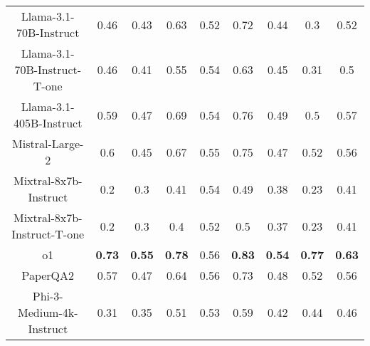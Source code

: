 \begin{tabular}{ccccccccc}
Llama-3.1-70B-Instruct & 0.46 & 0.43 & 0.63 & 0.52 & 0.72 & 0.44 & 0.3 & 0.52 \\
Llama-3.1-70B-Instruct-T-one & 0.46 & 0.41 & 0.55 & 0.54 & 0.63 & 0.45 & 0.31 & 0.5 \\
Llama-3.1-405B-Instruct & 0.59 & 0.47 & 0.69 & 0.54 & 0.76 & 0.49 & 0.5 & 0.57 \\
Mistral-Large-2 & 0.6 & 0.45 & 0.67 & 0.55 & 0.75 & 0.47 & 0.52 & 0.56 \\
Mixtral-8x7b-Instruct & 0.2 & 0.3 & 0.41 & 0.54 & 0.49 & 0.38 & 0.23 & 0.41 \\
Mixtral-8x7b-Instruct-T-one & 0.2 & 0.3 & 0.4 & 0.52 & 0.5 & 0.37 & 0.23 & 0.41 \\
o1 & \textbf{0.73} & \textbf{0.55} & \textbf{0.78} & 0.56 & \textbf{0.83} & \textbf{0.54} & \textbf{0.77} & \textbf{0.63} \\
PaperQA2 & 0.57 & 0.47 & 0.64 & 0.56 & 0.73 & 0.48 & 0.52 & 0.56 \\
Phi-3-Medium-4k-Instruct & 0.31 & 0.35 & 0.51 & 0.53 & 0.59 & 0.42 & 0.44 & 0.46 \\
\bottomrule
\end{tabular}
